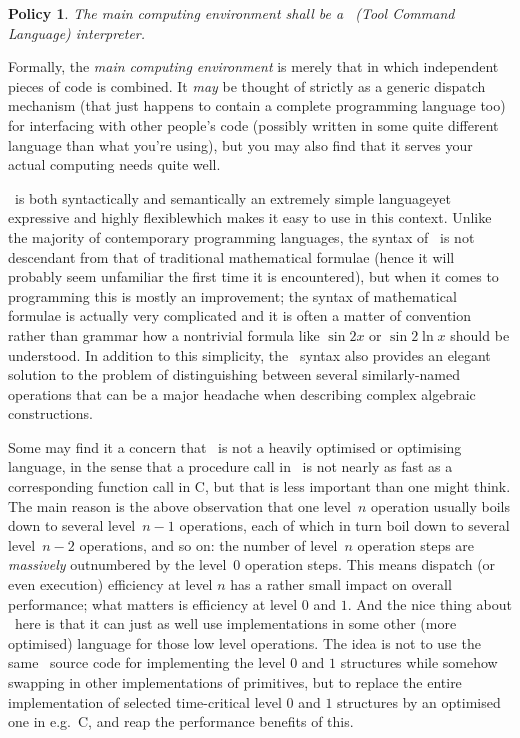 \documentclass{mtmtcl}
\theoremstyle{plain}
\newtheorem{policy}{Policy}
\theoremstyle{remark}
\begin{document}
\begin{policy} \label{Policy:Tcl}
  The main computing environment shall be a \Tcl~(Tool Command 
  Language) interpreter.
\end{policy}

Formally, the \emph{main computing environment} is merely that in 
which independent pieces of code is combined. It \emph{may} be 
thought of strictly as a generic dispatch mechanism (that just happens 
to contain a complete programming language too) for interfacing with 
other people's code (possibly written in some quite different language 
than what you're using), but you may also find that it serves your 
actual computing needs quite well.

\Tcl\ is both syntactically and semantically an extremely simple 
language\Ldash yet expressive and highly flexible\Rdash which makes 
it easy to use in this context. Unlike the majority of contemporary 
programming languages, the syntax of \Tcl\ is not descendant from that 
of traditional mathematical formulae (hence it will probably seem 
unfamiliar the first time it is encountered), but when it comes to 
programming this is mostly an improvement; the syntax of mathematical 
formulae is actually very complicated and it is often a matter of 
convention rather than grammar how a nontrivial formula like $\sin 
2x$ or $\sin 2\ln x$ should be understood. In addition to this 
simplicity, the \Tcl\ syntax also provides an elegant solution to 
the problem of distinguishing between several similarly-named 
operations that can be a major headache when describing complex 
algebraic constructions.

Some may find it a concern that \Tcl\ is not a heavily optimised or 
optimising language, in the sense that a procedure call in \Tcl\ is 
not nearly as fast as a corresponding function call in C, but that 
is less important than one might think. The main reason is the above 
observation that one level~$n$ operation usually boils down to 
several level~$n-1$ operations, each of which in turn boil down to 
several level~$n-2$ operations, and so on: the number of level~$n$ 
operation steps are \emph{massively} outnumbered by the level~$0$ 
operation steps. 
This means dispatch (or even execution) efficiency at level $n$ has a 
rather small impact on overall performance; what matters is 
efficiency at level $0$ and $1$. And the nice thing about \Tcl\ here 
is that it can just as well use implementations in some other (more 
optimised) language for those low level operations. The idea is not 
to use the same \Tcl\ source code for implementing the level $0$ and 
$1$ structures while somehow swapping in other implementations of 
primitives, but to replace the entire implementation of selected 
time-critical level $0$ and $1$ structures by an optimised one in 
e.g.~C, and reap the performance benefits of this.
\end{document}
